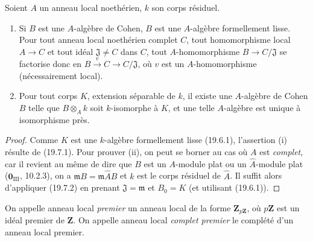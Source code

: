 
\begin{theorem}[19.8.2]
\label{0.19.8.2-fr}
Soient $A$ un anneau local noethérien, $k$ son corps résiduel.
\begin{enumerate}
  \item[(i)] Si $B$ est une $A$-algèbre de Cohen, $B$ est une $A$-algèbre
  formellement lisse. Pour tout anneau local noethérien complet $C$, tout
  homomorphisme local $A\to C$ et tout idéal $\mathfrak J\neq C$ dans $C$,
  tout $A$-homomorphisme $B\to C/\mathfrak J$ se factorise donc en
  $B\xrightarrow{v}C\to C/\mathfrak J$, où $v$ est un $A$-homomorphisme
  (nécessairement local).
  \item[(ii)] Pour tout corps $K$, extension séparable de $k$, il existe une
  $A$-algèbre de Cohen $B$ telle que $B\otimes_A k$ soit $k$-isomorphe à $K$,
  et une telle $A$-algèbre est unique à isomorphisme près.
\end{enumerate}
\end{theorem}

\begin{proof}
Comme $K$ est une $k$-algèbre formellement lisse (19.6.1), l'assertion (i)
résulte de (19.7.1). Pour prouver (ii), on peut se borner au cas où $A$ est
\emph{complet}, car il revient au même de dire que $B$ est un $A$-module plat
ou un $\widehat A$-module plat ($\mathbf 0_{\mathrm{III}}$, 10.2.3), on a
$\mathfrak mB=\mathfrak m\widehat AB$ et $k$ est le corps résiduel de
$\widehat A$. Il suffit alors d'appliquer (19.7.2) en prenant
$\mathfrak J=\mathfrak m$ et $B_0=K$ (et utilisant (19.6.1)).
\end{proof}

\begin{definition}[19.8.3]
\label{0.19.8.3-fr}
On appelle anneau local \emph{premier} un anneau local de la forme
$\mathbf Z_{p\mathbf Z}$, où $p\mathbf Z$ est un idéal premier de $\mathbf Z$.
On appelle anneau local \emph{complet premier} le complété d'un anneau local
premier.
\end{definition}

